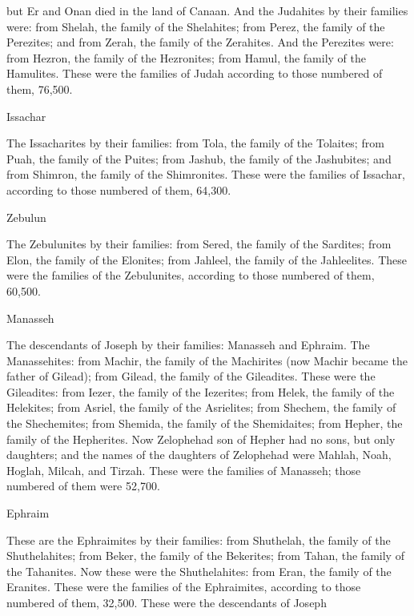 {but Er
and Onan
died
in the land
of Canaan.
And the Judahites
by their families
were: from Shelah,
the family
of the Shelahites;
from Perez,
the family
of the Perezites;
and from Zerah,
the family
of the Zerahites.
And the Perezites
were: from Hezron,
the family
of the Hezronites;
from Hamul,
the family
of the Hamulites.
These
were the families
of Judah
according to those numbered
of them, 76,500.
\par }{\SH Issachar
\par }{\PP {}The Issacharites
by their families: from Tola,
the family
of the Tolaites;
from Puah,
the family
of the Puites;
from Jashub,
the family
of the Jashubites;
and from Shimron,
the family
of the Shimronites.
These
were the families
of Issachar,
according to those numbered
of them, 64,300.
\par }{\SH Zebulun
\par }{\PP {}The Zebulunites
by their families: from Sered,
the family
of the Sardites;
from Elon,
the family
of the Elonites;
from Jahleel,
the family
of the Jahleelites.
These
were the families
of the Zebulunites,
according to those numbered
of them, 60,500.
\par }{\SH Manasseh
\par }{\PP {}The descendants
of Joseph
by their families: Manasseh
and Ephraim.
The Manassehites: from Machir,
the family
of the Machirites
(now Machir
became the father
of Gilead); from Gilead,
the family
of the Gileadites.
These
were the Gileadites: from Iezer,
the family
of the Iezerites;
from Helek,
the family
of the Helekites;
from Asriel,
the family
of the Asrielites;
from Shechem,
the family
of the Shechemites;
from Shemida,
the family
of the Shemidaites;
from Hepher,
the family
of the Hepherites.
Now Zelophehad
son
of Hepher
had no
sons,
but only
daughters;
and the names
of the daughters
of Zelophehad
were Mahlah,
Noah,
Hoglah,
Milcah,
and Tirzah.
These
were the families
of Manasseh;
those numbered
of them were 52,700.
\par }{\SH Ephraim
\par }{\PP {}These
are the Ephraimites
by their families: from Shuthelah,
the family
of the Shuthelahites;
from Beker,
the family
of the Bekerites;
from Tahan,
the family
of the Tahanites.
Now these
were the Shuthelahites: from Eran,
the family
of the Eranites.
These
were the families
of the Ephraimites,
according to those numbered
of them, 32,500.
These
were the descendants
of Joseph
}
